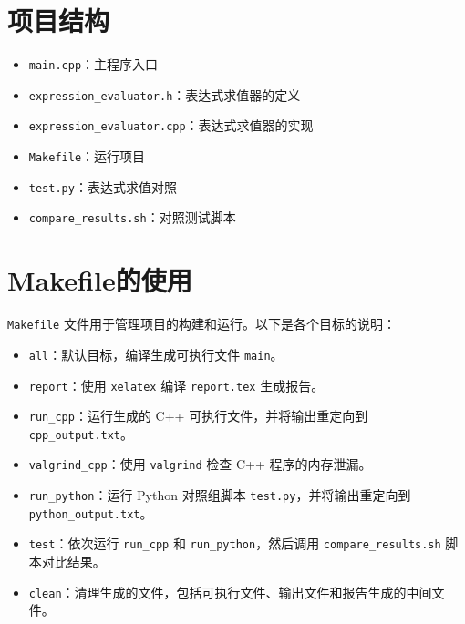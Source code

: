 \documentclass[UTF8]{ctexart}
\begin{document}
\sloppy %

\pagestyle{fancy}
\fancyhead{}

\section{项目结构}

\begin{itemize}

  \item \texttt{main.cpp}：主程序入口
  \item \texttt{expression\_evaluator.h}：表达式求值器的定义
  \item \texttt{expression\_evaluator.cpp}：表达式求值器的实现
  \item \texttt{Makefile}：运行项目
  \item \texttt{test.py}：表达式求值对照
  \item \texttt{compare\_results.sh}：对照测试脚本

\end{itemize}

\section{Makefile的使用}

\texttt{Makefile} 文件用于管理项目的构建和运行。以下是各个目标的说明：

\begin{itemize}
  \item \texttt{all}：默认目标，编译生成可执行文件 \texttt{main}。
  \item \texttt{report}：使用 \texttt{xelatex} 编译 \texttt{report.tex} 生成报告。
  \item \texttt{run\_cpp}：运行生成的 C++ 可执行文件，并将输出重定向到 \texttt{cpp\_output.txt}。
  \item \texttt{valgrind\_cpp}：使用 \texttt{valgrind} 检查 C++ 程序的内存泄漏。
  \item \texttt{run\_python}：运行 Python 对照组脚本 \texttt{test.py}，并将输出重定向到 \texttt{python\_output.txt}。
  \item \texttt{test}：依次运行 \texttt{run\_cpp} 和 \texttt{run\_python}，然后调用 \texttt{compare\_results.sh} 脚本对比结果。
  \item \texttt{clean}：清理生成的文件，包括可执行文件、输出文件和报告生成的中间文件。
\end{itemize}
\end{document}
